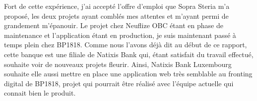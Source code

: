 \begin{changemargin}{-1cm}{-1cm}
	Fort de cette expérience, j'ai accepté l'offre d'emploi que Sopra Steria m'a proposé, les deux projets ayant comblés mes attentes et m'ayant permi de grandement m'épanouir. Le projet chez Neuflize OBC étant en phase de maintenance et l'application étant en production, je suis maintenant passé à temps plein chez BP1818. Comme nous l'avons déjà dit au début de ce rapport, cette banque est une filiale de Natixis Bank qui, étant satisfait du travail effectué, souhaite voir de nouveaux projets fleurir. Ainsi, Natixis Bank Luxembourg souhaite elle aussi mettre en place une application web très semblable au fronting digital de BP1818, projet qui pourrait être réalisé avec l'équipe actuelle qui connait bien le produit.
	
\end{changemargin}